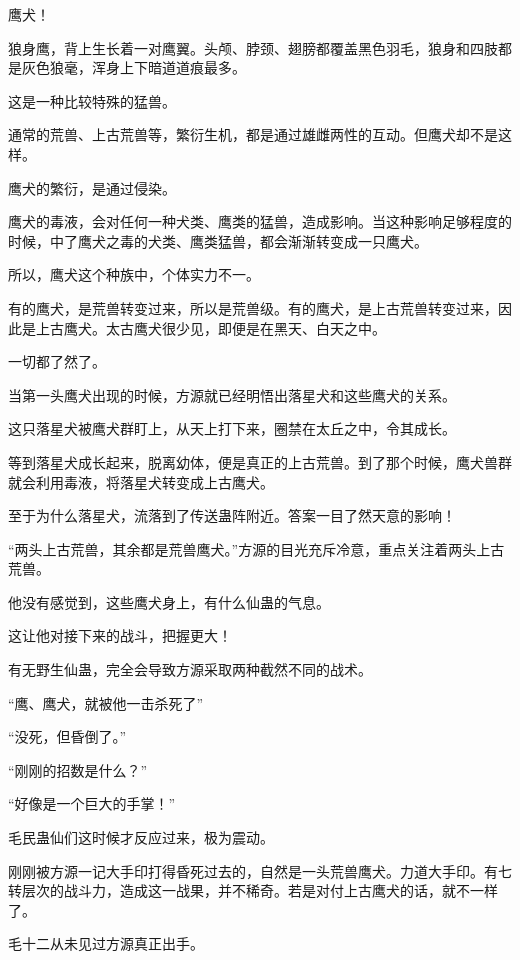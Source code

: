 
\begin{this_body}

鹰犬！

狼身鹰，背上生长着一对鹰翼。头颅、脖颈、翅膀都覆盖黑色羽毛，狼身和四肢都是灰色狼毫，浑身上下暗道道痕最多。

这是一种比较特殊的猛兽。

通常的荒兽、上古荒兽等，繁衍生机，都是通过雄雌两性的互动。但鹰犬却不是这样。

鹰犬的繁衍，是通过侵染。

鹰犬的毒液，会对任何一种犬类、鹰类的猛兽，造成影响。当这种影响足够程度的时候，中了鹰犬之毒的犬类、鹰类猛兽，都会渐渐转变成一只鹰犬。

所以，鹰犬这个种族中，个体实力不一。

有的鹰犬，是荒兽转变过来，所以是荒兽级。有的鹰犬，是上古荒兽转变过来，因此是上古鹰犬。太古鹰犬很少见，即便是在黑天、白天之中。

一切都了然了。

当第一头鹰犬出现的时候，方源就已经明悟出落星犬和这些鹰犬的关系。

这只落星犬被鹰犬群盯上，从天上打下来，圈禁在太丘之中，令其成长。

等到落星犬成长起来，脱离幼体，便是真正的上古荒兽。到了那个时候，鹰犬兽群就会利用毒液，将落星犬转变成上古鹰犬。

至于为什么落星犬，流落到了传送蛊阵附近。答案一目了然天意的影响！

“两头上古荒兽，其余都是荒兽鹰犬。”方源的目光充斥冷意，重点关注着两头上古荒兽。

他没有感觉到，这些鹰犬身上，有什么仙蛊的气息。

这让他对接下来的战斗，把握更大！

有无野生仙蛊，完全会导致方源采取两种截然不同的战术。

“鹰、鹰犬，就被他一击杀死了”

“没死，但昏倒了。”

“刚刚的招数是什么？”

“好像是一个巨大的手掌！”

毛民蛊仙们这时候才反应过来，极为震动。

刚刚被方源一记大手印打得昏死过去的，自然是一头荒兽鹰犬。力道大手印。有七转层次的战斗力，造成这一战果，并不稀奇。若是对付上古鹰犬的话，就不一样了。

毛十二从未见过方源真正出手。


\end{this_body}

